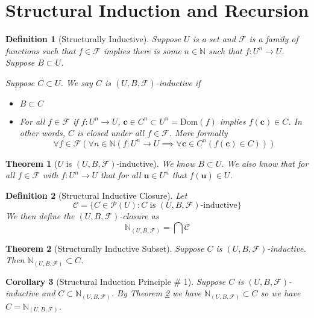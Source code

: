 \documentclass[12pt]{article}
\theoremstyle{break}
\newtheorem{definition}{Definition}[section]
\theoremstyle{break}
\newtheorem{theorem}{Theorem}[section]
\theoremstyle{break}
\newtheorem{corollary}[theorem]{Corollary}
\theoremstyle{break}
\theoremstyle{break}
\newtheorem{informal definition}[definition]{Informal Definition}
\newcommand{\bv}[1]{\boldsymbol{#1}}
\begin{document}
\section{Structural Induction and Recursion}

\begin{definition}[Structurally Inductive]
Suppose $U$ is a set and $\mathcal{F}$ is a family of functions such that $f \in \mathcal{F}$ implies there is some $n\in \mathbb{N}$ such that $f: U^n \to U$.
Suppose $B \subset U$.

Suppose $C \subset U$.
We say $C$ is $(U, B, \mathcal{F})$-inductive if
\begin{itemize}
\item{$B\subset C$}
\item{For all $f\in \mathcal{F}$ if $f:U^n\to U$, $\bv{c}\in C^n \subset U^n = \text{Dom}(f)$ implies $f(\bv{c})\in C$. In other words, $C$ is closed under all $f\in \mathcal{F}$. More formally
$$
\forall f\in \mathcal{F}(\forall n\in \mathbb{N}(f:U^n \to U \implies \forall \bv{c} \in C^n (f(\bv{c}) \in C)))
$$}
\end{itemize}
\end{definition}

\begin{theorem}[$U$ is $(U, B, \mathcal{F})$-inductive]
\label{thm:Uinductive}
We know $B\subset U$.
We also know that for all $f\in \mathcal{F}$ with $f:U^n \to U$ that for all $\bv{u}\in U^n$ that $f(\bv{u}) \in U$.
\end{theorem}

\begin{definition}[Structural Inductive Closure]
Let
$$
\mathcal{C} = \{C\in \mathcal{P}(U): C \text{ is } (U, B, \mathcal{F})\text{-inductive}\}
$$
We then define the $(U, B, \mathcal{F})$-closure as
$$
\mathbb{N}_{(U, B, \mathcal{F})} = \bigcap \mathcal{C}
$$
\end{definition}

\begin{theorem}[Structurally Inductive Subset]
\label{thm:indsubset}
Suppose $C$ is $(U, B, \mathcal{F})$-inductive.
Then $\mathbb{N}_{(U, B, \mathcal{F})} \subset C$.
\end{theorem}

\begin{corollary}[Structural Induction Principle \# 1]
Suppose $C$ is $(U, B, \mathcal{F})$-inductive and $C \subset \mathbb{N}_{(U, B, \mathcal{F})}$.
By Theorem \ref{thm:indsubset} we have $\mathbb{N}_{(U, B, \mathcal{F})} \subset C$ so we have $C = \mathbb{N}_{(U, B, \mathcal{F})}$.
\end{corollary}
\end{document}
